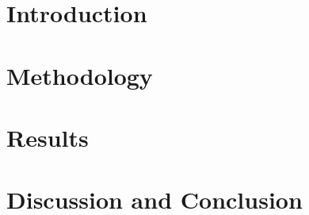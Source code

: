 \section{Introduction}
\label{ch:introduction3}


\section{Methodology}
\label{ch:method3}


\section{Results}
\label{ch:results3}




% 

\section{Discussion and Conclusion}
\label{ch:conclusion3}







